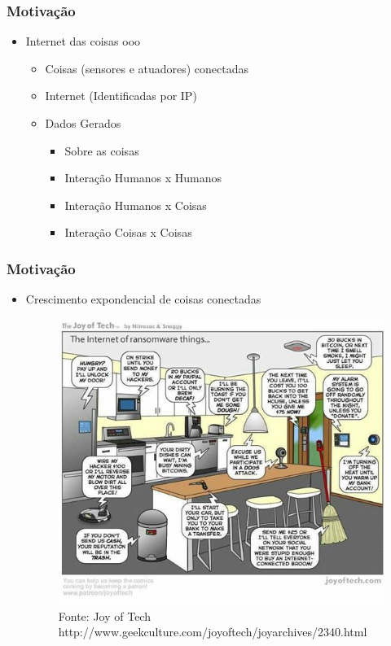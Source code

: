 \documentclass[hyperref={pdfpagelabels=false}]{beamer}
\begin{document}
\begin{frame}
	\frametitle{Motivação}

	\begin{itemize}
    	\item Internet das coisas ooo
	        \begin{itemize}
    	    	\item Coisas (sensores e atuadores) conectadas
       		   	\item Internet (Identificadas por IP)
          		\item Dados Gerados
                	\begin{itemize}
                    	\item Sobre as coisas
                        \item Interação Humanos x Humanos
                        \item Interação Humanos x Coisas
                        \item Interação Coisas x Coisas
                    \end{itemize}
        	\end{itemize}
	\end{itemize}		
\end{frame}

\begin{frame}
	\frametitle{Motivação}
    
	\begin{itemize}
		\item Crescimento expondencial de coisas conectadas
		    \begin{figure}
 		   		\centering
	        	\includegraphics[scale=0.3]{img/ransomwareIoT.jpeg}
  		    	\caption{\scriptsize{Fonte: Joy of Tech http://www.geekculture.com/joyoftech/joyarchives/2340.html}}
   			\end{figure}
	\end{itemize}   
\end{frame}
\end{document}
